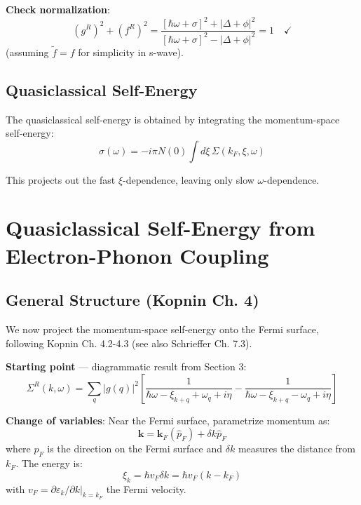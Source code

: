 \documentclass[12pt]{article}
\begin{document}
\textbf{Check normalization}:
\begin{equation}
(g^R)^2 + (f^R)^2 = \frac{[\hbar\omega + \sigma]^2 + |\Delta + \phi|^2}{[\hbar\omega + \sigma]^2 - |\Delta + \phi|^2} = 1 \quad \checkmark
\end{equation}
(assuming $\tilde{f} = f$ for simplicity in s-wave).

\subsection{Quasiclassical Self-Energy}

The quasiclassical self-energy is obtained by integrating the momentum-space self-energy:
\begin{equation}
\boxed{
\sigma(\omega) = -i\pi N(0) \int d\xi \, \Sigma(k_F, \xi, \omega)
}
\end{equation}

This projects out the fast $\xi$-dependence, leaving only slow $\omega$-dependence.

\section{Quasiclassical Self-Energy from Electron-Phonon Coupling}

\subsection{General Structure (Kopnin Ch. 4)}

We now project the momentum-space self-energy onto the Fermi surface, following Kopnin Ch. 4.2-4.3 (see also Schrieffer Ch. 7.3).

\textbf{Starting point} — diagrammatic result from Section 3:
\begin{equation}
\Sigma^R(k,\omega) = \sum_q |g(q)|^2 \left[\frac{1}{\hbar\omega - \xi_{k+q} + \omega_q + i\eta} - \frac{1}{\hbar\omega - \xi_{k+q} - \omega_q + i\eta}\right]
\end{equation}

\textbf{Change of variables}: Near the Fermi surface, parametrize momentum as:
\begin{equation}
\mathbf{k} = \mathbf{k}_F(\hat{p}_F) + \delta k \hat{p}_F
\end{equation}
where $\hat{p}_F$ is the direction on the Fermi surface and $\delta k$ measures the distance from $k_F$. The energy is:
\begin{equation}
\xi_k = \hbar v_F \delta k = \hbar v_F (k - k_F)
\end{equation}
with $v_F = \partial \varepsilon_k/\partial k|_{k=k_F}$ the Fermi velocity.
\end{document}
